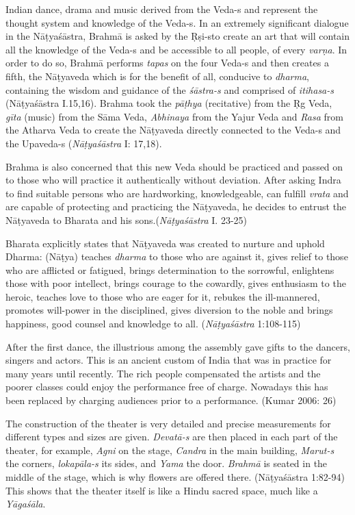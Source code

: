 Indian dance, drama and music derived from the Veda-s and represent the thought system and knowledge of the Veda-s. In an extremely significant dialogue in the Nāṭyaśāstra, Brahmā is asked by the Ṛṣi-s\break to create an art that will contain all the knowledge of the Veda-s and be accessible to all people, of every \textit{varṇa}. In order to do so, Brahmā performs \textit{tapas} on the four Veda-s and then creates a fifth, the Nāṭyaveda which is for the benefit of all, conducive to \textit{dharma}, containing the wisdom and guidance of the \textit{śāstra-s }and comprised of \textit{itihasa-s} (Nāṭyaśāstra I.15,16). Brahma took the \textit{pāṭhya} (recitative) from the Ṛg Veda, \textit{gīta} (music) from the Sāma Veda, \textit{Abhinaya} from the Yajur Veda and \textit{Rasa} from the Atharva Veda to create the Nāṭyaveda directly connected to the Veda-s and the Upaveda-s (\textit{Nāṭyaśāstra} I: 17,18).

Brahma is also concerned that this new Veda should be practiced and passed on to those who will practice it authentically without deviation. After asking Indra to find suitable persons who are hardworking, knowledgeable, can fulfill \textit{vrata} and are capable of protecting and practicing the Nāṭyaveda, he decides to entrust the Nāṭyaveda to Bharata and his sons.(\textit{Nāṭyaśāstra} I. 23-25)

Bharata explicitly states that Nāṭyaveda was created to nurture and uphold Dharma: (Nāṭya) teaches \textit{dharma} to those who are against it, gives relief to those who are afflicted or fatigued, brings determination to the sorrowful, enlightens those with poor intellect, brings courage to the cowardly, gives enthusiasm to the heroic, teaches love to those who are eager for it, rebukes the ill-mannered, promotes will-power in the disciplined, gives diversion to the noble and brings happiness, good counsel and knowledge to all. (\textit{Nāṭyaśāstra} 1:108-115)

After the first dance, the illustrious among the assembly gave gifts to the dancers, singers and actors. This is an ancient custom of India that was in practice for many years until recently. The rich people compensated the artists and the poorer classes could enjoy the performance free of charge. Nowadays this has been replaced by charging audiences prior to a performance. (Kumar 2006: 26)

The construction of the theater is very detailed and precise measurements for different types and sizes are given. \textit{Devatā-s} are then placed in each part of the theater, for example, \textit{Agni} on the stage, \textit{Candra }in the main building, \textit{Marut-s} the corners, \textit{lokapāla-s} its sides, and \textit{Yama} the door. \textit{Brahmā} is seated in the middle of the stage, which is why flowers are offered there. (Nāṭyaśāstra 1:82-94) This shows that the theater itself is like a Hindu sacred space, much like a \textit{Yāgaśāla}.

